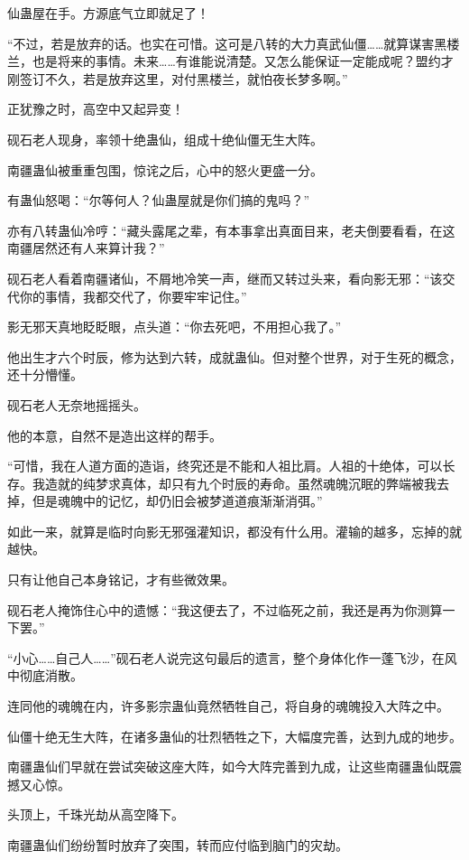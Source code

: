 \begin{this_body}
仙蛊屋在手。方源底气立即就足了！

“不过，若是放弃的话。也实在可惜。这可是八转的大力真武仙僵……就算谋害黑楼兰，也是将来的事情。未来……有谁能说清楚。又怎么能保证一定能成呢？盟约才刚签订不久，若是放弃这里，对付黑楼兰，就怕夜长梦多啊。”

正犹豫之时，高空中又起异变！

砚石老人现身，率领十绝蛊仙，组成十绝仙僵无生大阵。

南疆蛊仙被重重包围，惊诧之后，心中的怒火更盛一分。

有蛊仙怒喝：“尔等何人？仙蛊屋就是你们搞的鬼吗？”

亦有八转蛊仙冷哼：“藏头露尾之辈，有本事拿出真面目来，老夫倒要看看，在这南疆居然还有人来算计我？”

砚石老人看着南疆诸仙，不屑地冷笑一声，继而又转过头来，看向影无邪：“该交代你的事情，我都交代了，你要牢牢记住。”

影无邪天真地眨眨眼，点头道：“你去死吧，不用担心我了。”

他出生才六个时辰，修为达到六转，成就蛊仙。但对整个世界，对于生死的概念，还十分懵懂。

砚石老人无奈地摇摇头。

他的本意，自然不是造出这样的帮手。

“可惜，我在人道方面的造诣，终究还是不能和人祖比肩。人祖的十绝体，可以长存。我造就的纯梦求真体，却只有九个时辰的寿命。虽然魂魄沉眠的弊端被我去掉，但是魂魄中的记忆，却仍旧会被梦道道痕渐渐消弭。”

如此一来，就算是临时向影无邪强灌知识，都没有什么用。灌输的越多，忘掉的就越快。

只有让他自己本身铭记，才有些微效果。

砚石老人掩饰住心中的遗憾：“我这便去了，不过临死之前，我还是再为你测算一下罢。”

“小心……自己人……”砚石老人说完这句最后的遗言，整个身体化作一蓬飞沙，在风中彻底消散。

连同他的魂魄在内，许多影宗蛊仙竟然牺牲自己，将自身的魂魄投入大阵之中。

仙僵十绝无生大阵，在诸多蛊仙的壮烈牺牲之下，大幅度完善，达到九成的地步。

南疆蛊仙们早就在尝试突破这座大阵，如今大阵完善到九成，让这些南疆蛊仙既震撼又心惊。

头顶上，千珠光劫从高空降下。

南疆蛊仙们纷纷暂时放弃了突围，转而应付临到脑门的灾劫。

\end{this_body}

